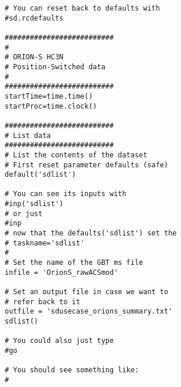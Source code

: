\begin{verbatim}
# You can reset back to defaults with
#sd.rcdefaults

##########################
#
# ORION-S HC3N
# Position-Switched data
#
##########################
startTime=time.time()
startProc=time.clock()

##########################
# List data
##########################
# List the contents of the dataset
# First reset parameter defaults (safe)
default('sdlist')

# You can see its inputs with
#inp('sdlist')
# or just
#inp
# now that the defaults('sdlist') set the
# taskname='sdlist'
#
# Set the name of the GBT ms file
infile = 'OrionS_rawACSmod'

# Set an output file in case we want to
# refer back to it
outfile = 'sdusecase_orions_summary.txt'
sdlist()

# You could also just type
#go

# You should see something like:
#
\end{verbatim}
\scriptsize
